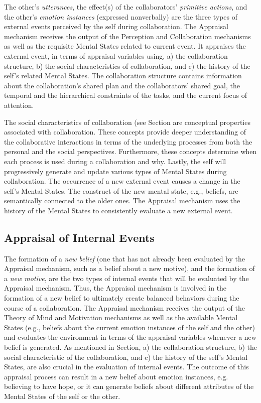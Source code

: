 \documentclass[letterpaper]{article}
\begin{document}
The other's \textit{utterances}, the effect(s) of the collaborators'
\textit{primitive actions}, and the other's \textit{emotion instances}
(expressed nonverbally) are the three types of external events perceived by the
self during collaboration. The Appraisal mechanism receives the output of the
Perception and Collaboration mechanisms as well as the requisite Mental States
related to current event. It appraises the external event, in terms of appraisal
variables using, a) the collaboration structure, b) the social characteristics
of collaboration, and c) the history of the self's related Mental States. The
collaboration structure contains information about the collaboration's shared
plan and the collaborators' shared goal, the temporal and the hierarchical
constraints of the tasks, and the current focus of attention. 

The social characteristics of collaboration (see Section are conceptual
properties associated with collaboration. These concepts provide deeper
understanding of the collaborative interactions in terms of the underlying
processes from both the personal and the social perspectives. Furthermore, these
concepts determine when each process is used during a collaboration and why.
Lastly, the self will progressively generate and update various types of Mental
States during collaboration. The occurrence of a new external event causes a
change in the self's Mental States. The construct of the new mental state, e.g.,
beliefs, are semantically connected to the older ones. The Appraisal mechanism
uses the history of the Mental States to consistently evaluate a new external
event.

\subsection{Appraisal of Internal Events}

The formation of a \textit{new belief} (one that has not already been evaluated
by the Appraisal mechanism, such as a belief about a new motive), and the
formation of a \textit{new motive}, are the two types of internal events that
will be evaluated by the Appraisal mechanism. Thus, the Appraisal mechanism is
involved in the formation of a new belief to ultimately create balanced
behaviors during the course of a collaboration. The Appraisal mechanism receives
the output of the Theory of Mind and Motivation mechanisms as well as the
available Mental States (e.g., beliefs about the current emotion instances of
the self and the other) and evaluates the environment in terms of the appraisal
variables whenever a new belief is generated. As mentioned in Section, a) the
collaboration structure, b) the social characteristic of the collaboration, and
c) the history of the self's Mental States, are also crucial in the evaluation
of internal events. The outcome of this appraisal process can result in a new
belief about emotion instances, e.g. believing to have hope, or it can generate
beliefs about different attributes of the Mental States of the self or the
other.
\end{document}
